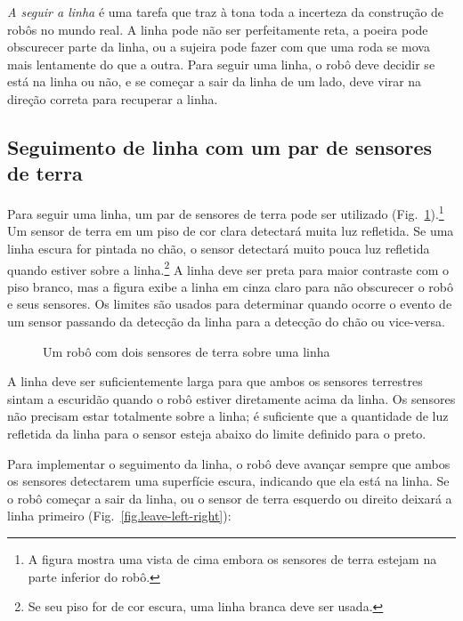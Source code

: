 \emph{A seguir a linha} é uma tarefa que traz à tona toda a incerteza da construção de robôs no mundo real. A linha pode não ser perfeitamente reta, a poeira pode obscurecer parte da linha, ou a sujeira pode fazer com que uma roda se mova mais lentamente do que a outra. Para seguir uma linha, o robô deve decidir se está na linha ou não, e se começar a sair da linha de um lado, deve virar na direção correta para recuperar a linha.

\subsection{Seguimento de linha com um par de sensores de terra}

Para seguir uma linha, um par de sensores de terra pode ser utilizado (Fig.~\ref{fig.ground-on-a-line}).\footnote{A figura mostra uma vista de cima embora os sensores de terra estejam na parte inferior do robô.} Um sensor de terra em um piso de cor clara detectará muita luz refletida. Se uma linha escura for pintada no chão, o sensor detectará muito pouca luz refletida quando estiver sobre a linha.\footnote{Se seu piso for de cor escura, uma linha branca deve ser usada.} A linha deve ser preta para maior contraste com o piso branco, mas a figura exibe a linha em cinza claro para não obscurecer o robô e seus sensores. Os limites são usados para determinar quando ocorre o evento de um sensor passando da detecção da linha para a detecção do chão ou vice-versa.

\begin{figure}
\begin{center}
\caption{Um robô com dois sensores de terra sobre uma linha}\label{fig.ground-on-a-line}
\end{center}
\end{figure}

A linha deve ser suficientemente larga para que ambos os sensores terrestres sintam a escuridão quando o robô estiver diretamente acima da linha. Os sensores não precisam estar totalmente sobre a linha; é suficiente que a quantidade de luz refletida da linha para o sensor esteja abaixo do limite definido para o preto.

Para implementar o seguimento da linha, o robô deve avançar sempre que ambos os sensores detectarem uma superfície escura, indicando que ela está na linha. Se o robô começar a sair da linha, ou o sensor de terra esquerdo ou direito deixará a linha primeiro (Fig.~\ref{fig.leave-left-right}):

